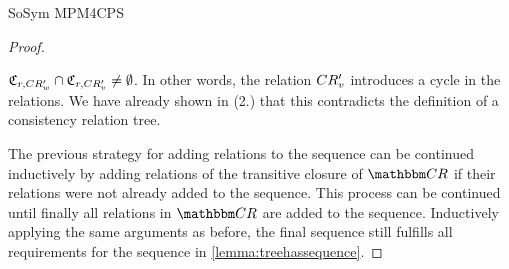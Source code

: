 \begin{copiedFrom}{SoSym MPM4CPS}
\begin{proof}
\begin{enumerate}
    $\mathfrak{C}_{r,CR'_{w}} \cap \mathfrak{C}_{r,CR'_{v}} \neq \emptyset$.
    In other words, the relation $CR'_{v}$ introduces a cycle in the relations.
    We have already shown in (2.) that this contradicts the definition of a consistency relation tree.
    \end{enumerate}
    The previous strategy for adding relations to the sequence can be continued inductively by adding relations of the transitive closure of $\consistencyrelationset{CR}$ if their relations were not already added to the sequence.
    This process can be continued until finally all relations in $\consistencyrelationset{CR}$ are added to the sequence.
    Inductively applying the same arguments as before, the final sequence still fulfills all requirements for the sequence in \autoref{lemma:treehassequence}.

\end{proof}
\end{copiedFrom}
